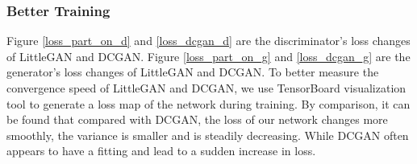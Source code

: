 \subsubsection*{Better Training}
Figure \ref{loss_part_on_d} and \ref{loss_dcgan_d} are the discriminator's loss changes of LittleGAN and DCGAN.
Figure \ref{loss_part_on_g} and \ref{loss_dcgan_g} are the generator's loss changes of LittleGAN and DCGAN.
To better measure the convergence speed of LittleGAN and DCGAN,
    we use TensorBoard visualization tool to generate a loss map of the network during training.
By comparison, it can be found that compared with DCGAN,
    the loss of our network changes more smoothly, the variance is smaller and is steadily decreasing.
While DCGAN often appears to have a fitting and lead to a sudden increase in loss.

